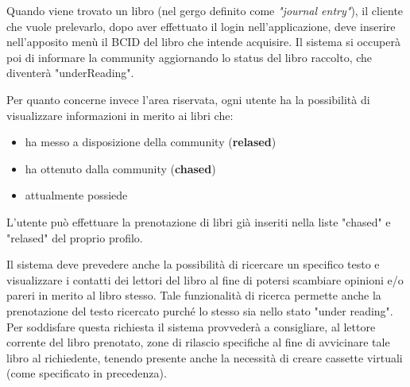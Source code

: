 Quando viene trovato un libro (nel gergo definito come \textit{"journal entry"}), il cliente che vuole prelevarlo, dopo
aver effettuato il login nell'applicazione, deve inserire nell'apposito menù il BCID del libro che intende acquisire.
Il sistema si occuperà poi di informare la community aggiornando lo status del libro raccolto, che diventerà "underReading".

Per quanto concerne invece l'area riservata, ogni utente ha la possibilità di 
visualizzare informazioni in merito ai libri che: 
\begin{itemize}
	\item ha messo a disposizione della community (\textbf{relased})
	\item ha ottenuto dalla community (\textbf{chased})
	\item attualmente possiede
\end{itemize}

L'utente può effettuare la prenotazione di libri già inseriti nella liste "chased" e "relased" del proprio profilo.


Il sistema deve prevedere anche la possibilità di ricercare un specifico testo e visualizzare i contatti dei
lettori del libro al fine di potersi scambiare opinioni e/o pareri in merito al libro stesso.
Tale funzionalità di ricerca permette anche la prenotazione del testo ricercato purché lo stesso sia nello
stato "under reading".
Per soddisfare questa richiesta il sistema provvederà a consigliare, al lettore corrente 
del libro prenotato, zone di rilascio specifiche al fine di avvicinare tale libro al richiedente, tenendo presente anche la necessità di creare cassette virtuali (come specificato in precedenza).